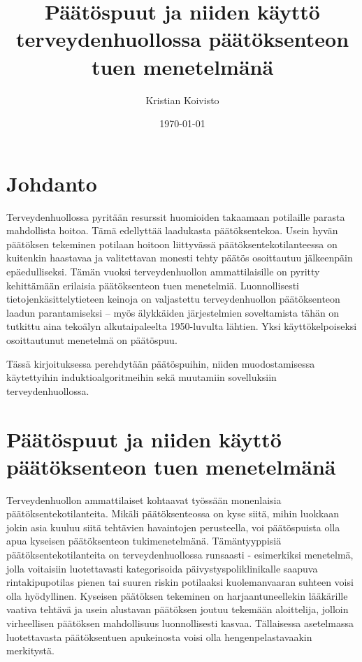 \documentclass[12pt,finnish]{tktltiki2}
\title{Päätöspuut ja niiden käyttö terveydenhuollossa päätöksenteon tuen menetelmänä}
\author{Kristian Koivisto}
\date{\today}
\theoremstyle{definition}
\theoremstyle{remark}
\begin{document}

\frontmatter      %

\maketitle        %
\makeabstract     %

\tableofcontents  %


\mainmatter       %

\section{Johdanto}
Terveydenhuollossa pyritään resurssit huomioiden takaamaan potilaille parasta mahdollista
hoitoa. Tämä edellyttää laadukasta päätöksentekoa. Usein hyvän päätöksen tekeminen
potilaan hoitoon liittyvässä päätöksentekotilanteessa on kuitenkin haastavaa ja valitettavan
monesti tehty päätös osoittautuu jälkeenpäin epäedulliseksi. Tämän vuoksi terveydenhuollon
ammattilaisille on pyritty kehittämään erilaisia päätöksenteon tuen menetelmiä.
Luonnollisesti tietojenkäsittelytieteen keinoja on valjastettu terveydenhuollon
päätöksenteon laadun parantamiseksi – myös älykkäiden järjestelmien soveltamista tähän
on tutkittu aina tekoälyn alkutaipaleelta 1950-luvulta lähtien. Yksi käyttökelpoiseksi
osoittautunut menetelmä on päätöspuu.

Tässä kirjoituksessa perehdytään päätöspuihin, niiden
muodostamisessa käytettyihin induktioalgoritmeihin sekä muutamiin sovelluksiin
terveydenhuollossa.


\section{Päätöspuut ja niiden käyttö päätöksenteon tuen menetelmänä}
Terveydenhuollon ammattilaiset kohtaavat työssään monenlaisia päätöksentekotilanteita. Mikäli
päätöksenteossa on kyse siitä, mihin luokkaan jokin asia kuuluu siitä tehtävien havaintojen
perusteella, voi päätöspuista olla apua kyseisen päätöksenteon tukimenetelmänä. Tämäntyyppisiä
päätöksentekotilanteita on terveydenhuollossa runsaasti - esimerkiksi menetelmä, jolla
voitaisiin luotettavasti kategorisoida päivystyspoliklinikalle saapuva rintakipupotilas
pienen tai suuren riskin potilaaksi kuolemanvaaran suhteen voisi olla hyödyllinen.
Kyseisen päätöksen tekeminen on harjaantuneellekin lääkärille vaativa tehtävä ja
usein alustavan päätöksen joutuu tekemään aloittelija, jolloin virheellisen päätöksen
mahdollisuus luonnollisesti kasvaa. Tällaisessa asetelmassa luotettavasta päätöksentuen
apukeinosta voisi olla hengenpelastavaakin merkitystä.
\end{document}
